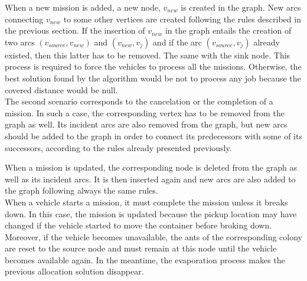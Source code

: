 \documentclass[a4paper,10pt]{article}
\begin{document}
When a new mission is added, a new node, $v_{new}$ is created in the graph. New arcs connecting $v_{new}$ to some other vertices are created following the rules described in the previous section. If the insertion of $v_{new}$ in the graph entails the creation of two arcs $(v_{source},v_{new})$ and $(v_{new},v_j)$ and if the arc $(v_{source},v_j)$ already existed, then this latter has to be removed. The same with the sink node. This process is required to force the vehicles to process all the missions. Otherwise, the best solution found by the algorithm would be not to process any job because the covered distance would be null.\\

The second scenario corresponds to the cancelation or the completion of a mission. In such a case, the corresponding vertex has to be removed from the graph as well. Its incident arcs are also removed from the graph, but new arcs should be added to the graph in order to connect its predecessors with some of its successors, according to the rules already presented previously. 


When a mission is updated, the corresponding node is deleted from the graph as well as its incident arcs. It is then inserted again  and new arcs are also added to the graph following always the same rules. \\ %

When a vehicle starts a mission, it must complete the mission unless it breaks down. In this case, the mission is updated because the pickup location may have changed if the vehicle started to move the container before broking down. Moreover, if the vehicle becomes unavailable, the ants of the corresponding colony are reset to the source node and must remain at this node until the vehicle becomes available again. In the meantime, the evaporation process makes the previous allocation solution disappear.\\
\end{document}
